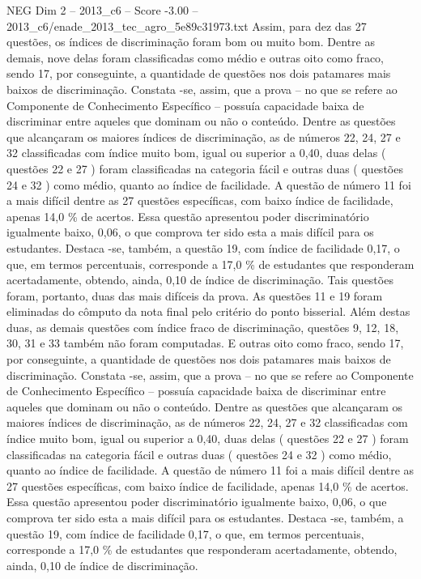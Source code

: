 \begin{textsample}{NEG Dim 2 – 2013\_c6 – Score -3.00 – 2013\_c6/enade\_2013\_tec\_agro\_5e89c31973.txt}
Assim, para dez das 27 questões, os índices de discriminação foram bom ou muito bom.
Dentre as demais, nove delas foram classificadas como médio e outras oito como fraco, sendo 17, por conseguinte, a quantidade de questões nos dois patamares mais baixos de discriminação.
Constata -se, assim, que a prova – no que se refere ao Componente de Conhecimento Específico – possuía capacidade baixa de discriminar entre aqueles que dominam ou não o conteúdo.
Dentre as questões que alcançaram os maiores índices de discriminação, as de números 22, 24, 27 e 32 classificadas com índice muito bom, igual ou superior a 0,40, duas delas ( questões 22 e 27 ) foram classificadas na categoria fácil e outras duas ( questões 24 e 32 ) como médio, quanto ao índice de facilidade.
A questão de número 11 foi a mais difícil dentre as 27 questões específicas, com baixo índice de facilidade, apenas 14,0 \% de acertos.
Essa questão apresentou poder discriminatório igualmente baixo, 0,06, o que comprova ter sido esta a mais difícil para os estudantes.
Destaca -se, também, a questão 19, com índice de facilidade 0,17, o que, em termos percentuais, corresponde a 17,0 \% de estudantes que responderam acertadamente, obtendo, ainda, 0,10 de índice de discriminação.
Tais questões foram, portanto, duas das mais difíceis da prova.
As questões 11 e 19 foram eliminadas do cômputo da nota final pelo critério do ponto bisserial.
Além destas duas, as demais questões com índice fraco de discriminação, questões 9, 12, 18, 30, 31 e 33 também não foram computadas.
E outras oito como fraco, sendo 17, por conseguinte, a quantidade de questões nos dois patamares mais baixos de discriminação.
Constata -se, assim, que a prova – no que se refere ao Componente de Conhecimento Específico – possuía capacidade baixa de discriminar entre aqueles que dominam ou não o conteúdo.
Dentre as questões que alcançaram os maiores índices de discriminação, as de números 22, 24, 27 e 32 classificadas com índice muito bom, igual ou superior a 0,40, duas delas ( questões 22 e 27 ) foram classificadas na categoria fácil e outras duas ( questões 24 e 32 ) como médio, quanto ao índice de facilidade.
A questão de número 11 foi a mais difícil dentre as 27 questões específicas, com baixo índice de facilidade, apenas 14,0 \% de acertos.
Essa questão apresentou poder discriminatório igualmente baixo, 0,06, o que comprova ter sido esta a mais difícil para os estudantes.
Destaca -se, também, a questão 19, com índice de facilidade 0,17, o que, em termos percentuais, corresponde a 17,0 \% de estudantes que responderam acertadamente, obtendo, ainda, 0,10 de índice de discriminação.

\end{textsample}
